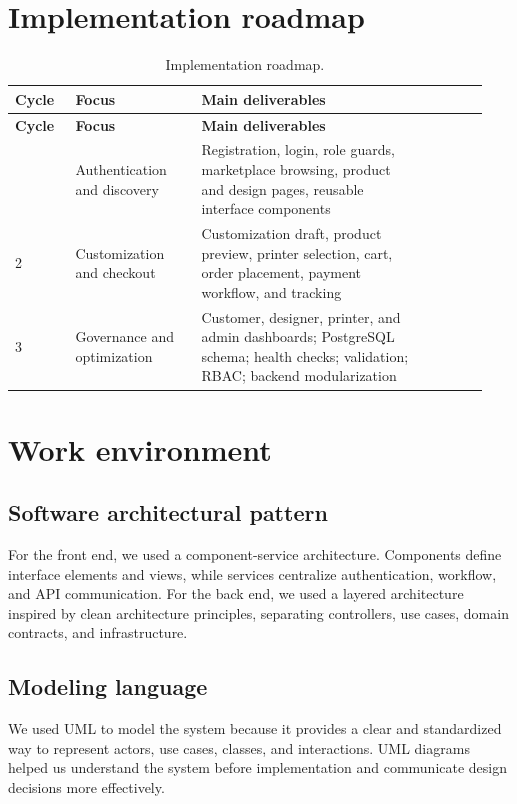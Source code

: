 \section{Implementation roadmap}
\begin{longtable}{|p{0.12\linewidth}|p{0.25\linewidth}|p{0.45\linewidth}|p{0.12\linewidth}|}
\caption{Implementation roadmap.} \label{tab:implementation_roadmap} \\
\hline
\textbf{Cycle} & \textbf{Focus} & \textbf{Main deliverables} \\ \hline
\endfirsthead
\hline
\textbf{Cycle} & \textbf{Focus} & \textbf{Main deliverables} \\ \hline
\endhead
\hline
\endfoot
1 & Authentication and discovery & Registration, login, role guards, marketplace browsing, product and design pages, reusable interface components \\ \hline
2 & Customization and checkout & Customization draft, product preview, printer selection, cart, order placement, payment workflow, and tracking \\ \hline
3 & Governance and optimization & Customer, designer, printer, and admin dashboards; PostgreSQL schema; health checks; validation; RBAC; backend modularization \\ \hline
\end{longtable}

\section{Work environment}
\subsection{Software architectural pattern}
For the front end, we used a component-service architecture.
Components define interface elements and views, while services centralize authentication, workflow, and API communication.
For the back end, we used a layered architecture inspired by clean architecture principles, separating controllers, use cases, domain contracts, and infrastructure.

\subsection{Modeling language}
We used UML to model the system because it provides a clear and standardized way to represent actors, use cases, classes, and interactions.
UML diagrams helped us understand the system before implementation and communicate design decisions more effectively.

